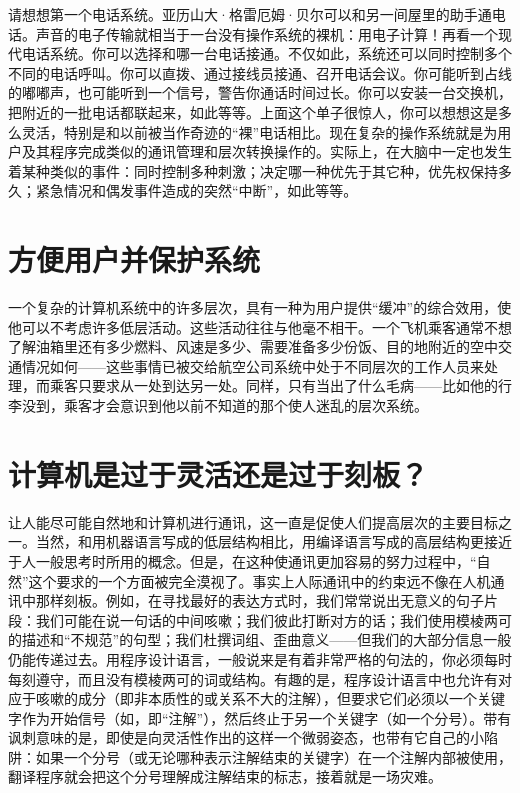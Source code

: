 请想想第一个电话系统。亚历山大·格雷厄姆·贝尔可以和另一间屋里的助手通电话。声音的电子传输就相当于一台没有操作系统的裸机：用电子计算！再看一个现代电话系统。你可以选择和哪一台电话接通。不仅如此，系统还可以同时控制多个不同的电话呼叫。你可以直拨、通过接线员接通、召开电话会议。你可能听到占线的嘟嘟声，也可能听到一个信号，警告你通话时间过长。你可以安装一台交换机，把附近的一批电话都联起来，如此等等。上面这个单子很惊人，你可以想想这是多么灵活，特别是和以前被当作奇迹的“裸”电话相比。现在复杂的操作系统就是为用户及其程序完成类似的通讯管理和层次转换操作的。实际上，在大脑中一定也发生着某种类似的事件：同时控制多种刺激；决定哪一种优先于其它种，优先权保持多久；紧急情况和偶发事件造成的突然“中断”，如此等等。

\section{方便用户并保护系统}

一个复杂的计算机系统中的许多层次，具有一种为用户提供“缓冲”的综合效用，使他可以不考虑许多低层活动。这些活动往往与他毫不相干。一个飞机乘客通常不想了解油箱里还有多少燃料、风速是多少、需要准备多少份饭、目的地附近的空中交通情况如何——这些事情已被交给航空公司系统中处于不同层次的工作人员来处理，而乘客只要求从一处到达另一处。同样，只有当出了什么毛病——比如他的行李没到，乘客才会意识到他以前不知道的那个使人迷乱的层次系统。

\section{计算机是过于灵活还是过于刻板？}

让人能尽可能自然地和计算机进行通讯，这一直是促使人们提高层次的主要目标之一。当然，和用机器语言写成的低层结构相比，用编译语言写成的高层结构更接近于人一般思考时所用的概念。但是，在这种使通讯更加容易的努力过程中，“自然”这个要求的一个方面被完全漠视了。事实上人际通讯中的约束远不像在人机通讯中那样刻板。例如，在寻找最好的表达方式时，我们常常说出无意义的句子片段：我们可能在说一句话的中间咳嗽；我们彼此打断对方的话；我们使用模棱两可的描述和“不规范”的句型；我们杜撰词组、歪曲意义——但我们的大部分信息一般仍能传递过去。用程序设计语言，一般说来是有着非常严格的句法的，你必须每时每刻遵守，而且没有模棱两可的词或结构。有趣的是，程序设计语言中也允许有对应于咳嗽的成分（即非本质性的或关系不大的注解），但要求它们必须以一个关键字作为开始信号（如，即“注解”），然后终止于另一个关键字（如一个分号）。带有讽刺意味的是，即使是向灵活性作出的这样一个微弱姿态，也带有它自己的小陷阱：如果一个分号（或无论哪种表示注解结束的关键字）在一个注解内部被使用，翻译程序就会把这个分号理解成注解结束的标志，接着就是一场灾难。

